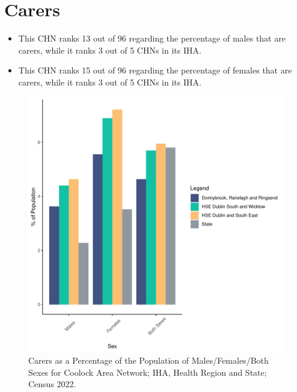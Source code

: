 \documentclass{article}
\begin{document}
\section{Carers}\label{sect:Carers}
\begin{itemize}
\item This CHN ranks  13 out of 96 regarding the percentage of males that are carers, while it ranks   3 out of 5 CHNs in its IHA.
\item This CHN ranks  15 out of 96 regarding the percentage of females that are carers, while it ranks   3 out of 5 CHNs in its IHA.
\end{itemize}
\begin{figure}[H]
	\centering
	\includegraphics[width = 150mm]{../figures/CareED.pdf}
	\caption{Carers as a Percentage of the Population of Males/Females/Both Sexes for Coolock Area Network; IHA, Health Region and State; Census 2022.}
	\label{fig:2ae19629-1a6a-13a3-e055-000000000001}
	\end{figure}
\end{document}
